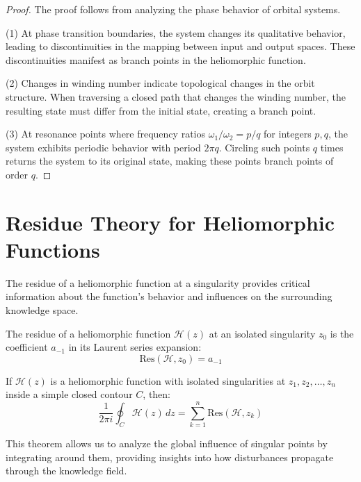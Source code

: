 \begin{definition}
\begin{enumerate}
\begin{proof}
The proof follows from analyzing the phase behavior of orbital systems.

(1) At phase transition boundaries, the system changes its qualitative behavior, leading to discontinuities in the mapping between input and output spaces. These discontinuities manifest as branch points in the heliomorphic function.

(2) Changes in winding number indicate topological changes in the orbit structure. When traversing a closed path that changes the winding number, the resulting state must differ from the initial state, creating a branch point.

(3) At resonance points where frequency ratios $\omega_1/\omega_2 = p/q$ for integers $p, q$, the system exhibits periodic behavior with period $2\pi q$. Circling such points $q$ times returns the system to its original state, making these points branch points of order $q$.
\end{proof}

\section{Residue Theory for Heliomorphic Functions}

The residue of a heliomorphic function at a singularity provides critical information about the function's behavior and influences on the surrounding knowledge space.

\begin{definition}[Residue]
The residue of a heliomorphic function $\mathcal{H}(z)$ at an isolated singularity $z_0$ is the coefficient $a_{-1}$ in its Laurent series expansion:
\begin{equation}
\text{Res}(\mathcal{H}, z_0) = a_{-1}
\end{equation}
\end{definition}

\begin{theorem}
If $\mathcal{H}(z)$ is a heliomorphic function with isolated singularities at $z_1, z_2, \ldots, z_n$ inside a simple closed contour $C$, then:
\begin{equation}
\frac{1}{2\pi i} \oint_C \mathcal{H}(z) \, dz = \sum_{k=1}^n \text{Res}(\mathcal{H}, z_k)
\end{equation}
\end{theorem}

This theorem allows us to analyze the global influence of singular points by integrating around them, providing insights into how disturbances propagate through the knowledge field.


\end{enumerate}
\end{definition}
